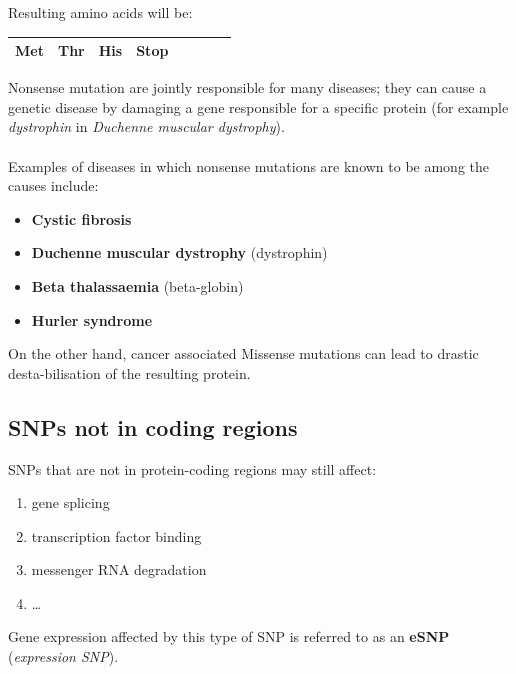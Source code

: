 \vspace{15mm}

Resulting amino acids will be:

\vspace{5mm}

\begin{tabular}{|l|l|l|l|l|l|rl|}
\hline
Met         &	Thr         &	His         &	\textbf{Stop}         &	            &	            &	     	&       \\
\hline
\end{tabular}

\vspace{20mm}

Nonsense mutation are jointly responsible for many diseases; they can cause a genetic disease by damaging a gene responsible for a specific protein (for example \emph{dystrophin} in \emph{Duchenne muscular dystrophy}). 
\\
\\Examples of diseases in which nonsense mutations are known to be among the causes include:

\begin{itemize}
	\item \textbf{Cystic fibrosis}
	\item \textbf{Duchenne muscular dystrophy} (dystrophin)
	\item \textbf{Beta thalassaemia} (beta-globin)
	\item \textbf{Hurler syndrome}
	\end{itemize}

\vspace{10mm}

On the other hand, cancer associated Missense mutations can lead to drastic desta-bilisation of the resulting protein.


\subsection{SNPs not in coding regions}

SNPs that are not in protein-coding regions may still affect:

\begin{enumerate}
	\item gene splicing
	\item transcription factor binding
	\item messenger RNA degradation
	\item \ldots
	\end{enumerate}

Gene expression affected by this type of SNP is referred to as an \textbf{eSNP} (\emph{expression SNP}).